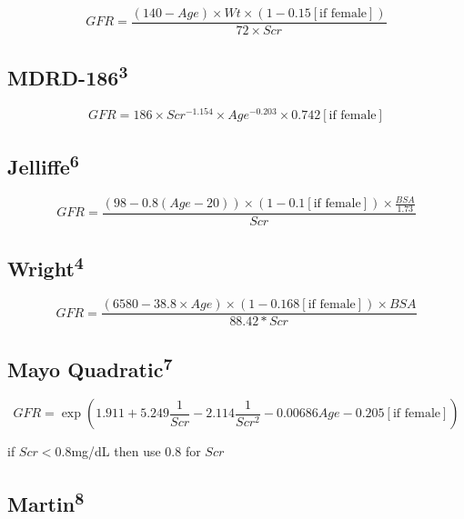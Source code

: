 \documentclass[11pt,]{article}
\begin{document}
\begin{equation*}
 GFR = \frac{(140-Age) \times Wt \times (1-0.15[\text{if female}])}{72\times Scr}
\end{equation*}

\subsection{\texorpdfstring{MDRD-186\textsuperscript{3}}{MDRD-1863}}\label{mdrd-186-levey2016}

\begin{equation*}
GFR = 186 \times Scr^{-1.154} \times Age^{-0.203} \times 0.742 [\text{if female}]
\end{equation*}

\subsection{\texorpdfstring{Jelliffe\textsuperscript{6}}{Jelliffe6}}\label{jelliffe-jelliffe1973}

\begin{equation*}
GFR = \frac{(98-0.8(Age-20))\times(1-0.1[\text{if female}])\times \frac{BSA}{1.73}}{Scr}
\end{equation*}

\subsection{\texorpdfstring{Wright\textsuperscript{4}}{Wright4}}\label{wright-wright2001a}

\begin{equation*}
GFR = \frac{(6580-38.8\times Age)\times(1-0.168[\text{if female}])\times BSA}{88.42*Scr}
\end{equation*}

\subsection{\texorpdfstring{Mayo
Quadratic\textsuperscript{7}}{Mayo Quadratic7}}\label{mayo-quadratic-rule2004}

\begin{equation*}
GFR = \exp \left(1.911 + 5.249\frac{1}{Scr} - 2.114\frac{1}{Scr^2} - 0.00686Age - 0.205 [\text{if female}]\right)
\end{equation*}

if \(Scr < 0.8\)mg/dL then use \(0.8\) for \(Scr\)

\subsection{\texorpdfstring{Martin\textsuperscript{8}}{Martin8}}\label{martin-martin1998}
\end{document}
